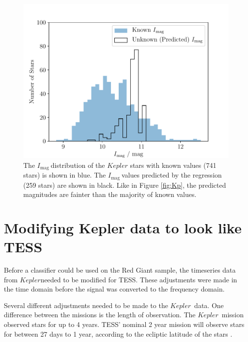 \documentclass[a4paper,fleqn,usenatbib,useAMS]{mnras}
\newcommand{\kep}{\ensuremath{Kepler}\:}
\newcommand{\imag}{\ensuremath{I_{\textrm{mag}}\:}}
\begin{document}
\begin{figure}
	\centering
	\includegraphics[scale=0.5]{Plot3_Imag_trained_distribution}
	\caption{The \imag distribution of the $Kepler$ stars with known values (741 stars) is shown in blue. The \imag values predicted by the regression (259 stars) are shown in black. Like in Figure \ref{fig:Kp}, the predicted magnitudes are fainter than the majority of known values.}	
	\label{fig:imag train}
\end{figure}


\section{Modifying Kepler data to look like TESS}
\label{sect: tess-like}

Before a classifier could be used on the Red Giant sample, the timeseries data from \kep needed to be modified for TESS. These adjustments were made in the time domain before the signal was converted to the frequency domain.

Several different adjustments needed to be made to the \kep \ data. One difference between the missions is the length of observation. The \kep \ mission observed stars for up to 4 years. TESS' nominal 2 year mission will observe stars for between 27 days to 1 year, according to the ecliptic latitude of the stars \citep{ricker_transiting_2014}.
\end{document}
